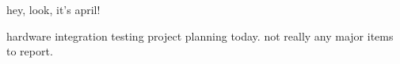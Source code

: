 hey, look, it's april!

hardware integration testing \amp project planning today. not really any major
items to report.
